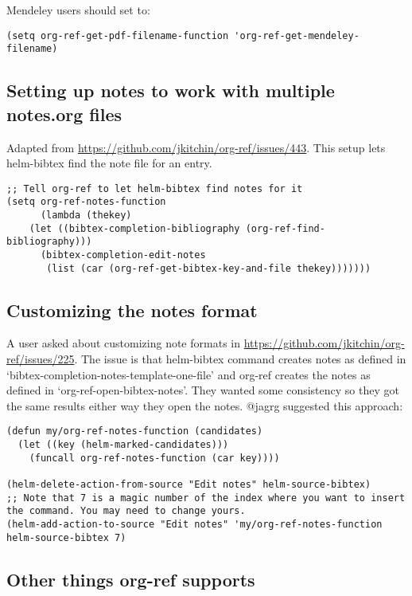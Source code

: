 \documentclass[11pt]{article}
\begin{document}
Mendeley users should set to:

\begin{verbatim}
(setq org-ref-get-pdf-filename-function 'org-ref-get-mendeley-filename)
\end{verbatim}

\subsection{Setting up notes to work with multiple notes.org files}
\label{sec:org1a8fe7b}

Adapted from \url{https://github.com/jkitchin/org-ref/issues/443}. This setup lets helm-bibtex find the note file for an entry.

\begin{verbatim}
;; Tell org-ref to let helm-bibtex find notes for it
(setq org-ref-notes-function
      (lambda (thekey)
	(let ((bibtex-completion-bibliography (org-ref-find-bibliography)))
	  (bibtex-completion-edit-notes
	   (list (car (org-ref-get-bibtex-key-and-file thekey)))))))
\end{verbatim}

\subsection{Customizing the notes format}
\label{sec:org6d339e0}

A user asked about customizing note formats in \url{https://github.com/jkitchin/org-ref/issues/225}. The issue is that helm-bibtex command creates notes as defined in `bibtex-completion-notes-template-one-file' and org-ref creates the notes as defined in `org-ref-open-bibtex-notes'. They wanted some consistency so they got the same results either way they open the notes. @jagrg suggested this approach:

\begin{verbatim}
(defun my/org-ref-notes-function (candidates)
  (let ((key (helm-marked-candidates)))
    (funcall org-ref-notes-function (car key))))

(helm-delete-action-from-source "Edit notes" helm-source-bibtex)
;; Note that 7 is a magic number of the index where you want to insert the command. You may need to change yours.
(helm-add-action-to-source "Edit notes" 'my/org-ref-notes-function helm-source-bibtex 7)
\end{verbatim}

\subsection{Other things org-ref supports}
\label{sec:org89c5228}
\end{document}
